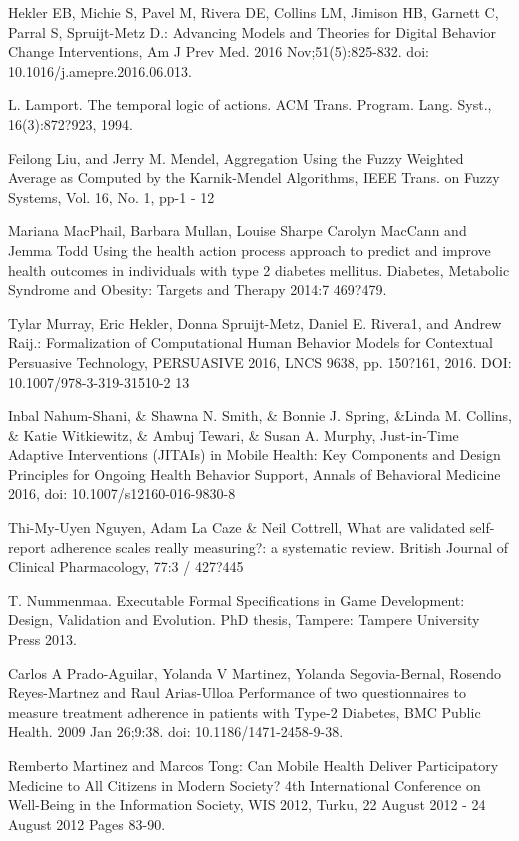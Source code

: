 \documentclass[graybox]{svmult}
\begin{document}
\begin{thebibliography}{99}
 Hekler EB, Michie S, Pavel M, Rivera DE, Collins LM, Jimison HB, Garnett C, Parral S, Spruijt-Metz D.: Advancing Models and Theories for Digital Behavior Change Interventions, Am J Prev Med. 2016 Nov;51(5):825-832. doi: 10.1016/j.amepre.2016.06.013.

 L. Lamport. The temporal logic of actions. ACM Trans. Program. Lang. Syst., 16(3):872?923, 1994.

 Feilong Liu,  and Jerry M. Mendel, Aggregation Using the Fuzzy Weighted Average as Computed by the Karnik-Mendel Algorithms, IEEE Trans. on Fuzzy Systems, Vol. 16, No. 1, pp-1 - 12 

 Mariana MacPhail, Barbara Mullan, Louise Sharpe Carolyn MacCann and Jemma Todd Using the health action process approach to predict and improve health outcomes in individuals with type 2 diabetes mellitus. Diabetes, Metabolic Syndrome and Obesity: Targets and Therapy 2014:7 469?479.

 Tylar Murray, Eric Hekler, Donna Spruijt-Metz, Daniel E. Rivera1, and Andrew Raij.: Formalization of Computational Human Behavior Models for Contextual Persuasive Technology, PERSUASIVE 2016, LNCS 9638, pp. 150?161, 2016. DOI: 10.1007/978-3-319-31510-2 13

 Inbal Nahum-Shani, \& Shawna N. Smith,  \& Bonnie J. Spring,  \&Linda M. Collins,  \& Katie Witkiewitz,  \& Ambuj Tewari, \& Susan A. Murphy, Just-in-Time Adaptive Interventions (JITAIs) in Mobile Health: Key Components and Design Principles for Ongoing Health Behavior Support, Annals of Behavioral Medicine 2016, doi: 10.1007/s12160-016-9830-8

 Thi-My-Uyen Nguyen, Adam La Caze \& Neil Cottrell, What are validated self-report adherence scales really measuring?: a systematic review. British Journal of Clinical Pharmacology, 77:3 / 427?445

 T. Nummenmaa. Executable Formal Specifications in Game Development: Design, Validation and Evolution. PhD  thesis, Tampere: Tampere University  Press 2013.

 Carlos A Prado-Aguilar, Yolanda V Martinez, Yolanda Segovia-Bernal, Rosendo Reyes-Martnez and Raul Arias-Ulloa Performance of two questionnaires to measure treatment adherence in patients with Type-2 Diabetes, BMC Public Health. 2009 Jan 26;9:38. doi: 10.1186/1471-2458-9-38.

 Remberto Martinez and Marcos Tong: Can Mobile Health Deliver Participatory Medicine to  All Citizens in Modern Society? 4th International Conference on Well-Being in the Information Society, WIS 2012, Turku, 22 August 2012 - 24 August 2012 Pages 83-90.


\end{thebibliography}
\end{document}
